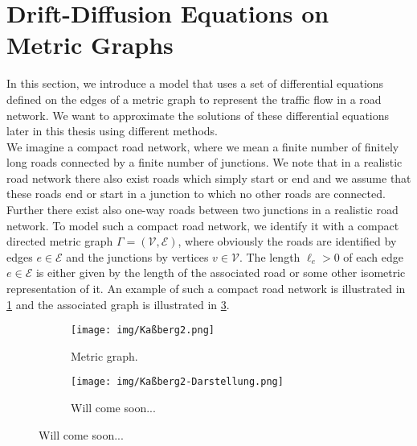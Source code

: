 \section{Drift-Diffusion Equations on Metric Graphs}
\label{ch1:sec2}

In this section, we introduce a model that uses a set of differential equations defined on the edges of a metric graph to represent the traffic flow in a road network. We want to approximate the solutions of these differential equations later in this thesis using different methods.  \\
We imagine a compact road network, where we mean a finite number of finitely long roads connected by a finite number of junctions. We note that in a realistic road network there also exist roads which simply start or end and we assume that these roads end or start in a junction to which no other roads are connected. Further there exist also one-way roads between two junctions in a realistic road network. To model such a compact road network, we identify it with a compact directed metric graph $\Gamma = (\mathcal{V}, \mathcal{E})$, where obviously the roads are identified by edges $e \in \mathcal{E}$ and the junctions by vertices $v \in \mathcal{V}$. The length $\ell_e > 0$ of each edge $e \in \mathcal{E}$ is either given by the length of the associated road or some other isometric representation of it. An example of such a compact road network is illustrated in \cref{fig8:f1} and the associated graph is illustrated in \cref{fig8:f2}. \\

\begin{figure}[H]
    \begin{center}
        \begin{subfigure}[b]{0.4\textwidth}
            \begin{center}
                \texttt{[image: img/Kaßberg2.png]}
            \end{center}
            \caption{Metric graph.}
            \label{fig8:f1}
        \end{subfigure}
        \begin{subfigure}[b]{0.4\textwidth}
            \begin{center}
                \texttt{[image: img/Kaßberg2-Darstellung.png]}
            \end{center}
            \caption{Will come soon...}
            \label{fig8:f2}
        \end{subfigure}
    \end{center}
    \caption{Will come soon...}
\end{figure}

